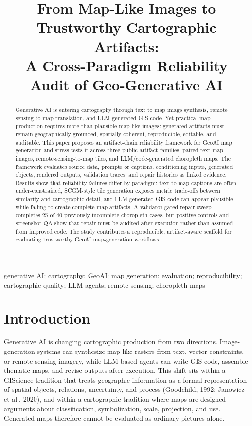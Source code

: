 \documentclass[]{interact}
\begin{document}

\title{From Map-Like Images to Trustworthy Cartographic Artifacts:\\ A Cross-Paradigm Reliability Audit of Geo-Generative AI}
\author{
}

\maketitle

\begin{abstract}
Generative AI is entering cartography through text-to-map image synthesis, remote-sensing-to-map translation, and LLM-generated GIS code. Yet practical map production requires more than plausible map-like images: generated artifacts must remain geographically grounded, spatially coherent, reproducible, editable, and auditable. This paper proposes an artifact-chain reliability framework for GeoAI map generation and stress-tests it across three public artifact families: paired text-map images, remote-sensing-to-map tiles, and LLM/code-generated choropleth maps. The framework evaluates source data, prompts or captions, conditioning inputs, generated objects, rendered outputs, validation traces, and repair histories as linked evidence. Results show that reliability failures differ by paradigm: text-to-map captions are often under-constrained, SCGM-style tile generation exposes metric trade-offs between similarity and cartographic detail, and LLM-generated GIS code can appear plausible while failing to create complete map artifacts. A validator-gated repair sweep completes 25 of 40 previously incomplete choropleth cases, but positive controls and screenshot QA show that repair must be audited after execution rather than assumed from improved code. The study contributes a reproducible, artifact-aware scaffold for evaluating trustworthy GeoAI map-generation workflows.
\end{abstract}
\begin{keywords}
generative AI; cartography; GeoAI; map generation; evaluation; reproducibility; cartographic quality; LLM agents; remote sensing; choropleth maps
\end{keywords}

\section{Introduction}

Generative AI is changing cartographic production from two directions. Image-generation systems can synthesize map-like rasters from text, vector constraints, or remote-sensing imagery, while LLM-based agents can write GIS code, assemble thematic maps, and revise outputs after execution. This shift sits within a GIScience tradition that treats geographic information as a formal representation of spatial objects, relations, uncertainty, and process (Goodchild, 1992; Janowicz et al., 2020), and within a cartographic tradition where maps are designed arguments about classification, symbolization, scale, projection, and use. Generated maps therefore cannot be evaluated as ordinary pictures alone.
\end{document}
